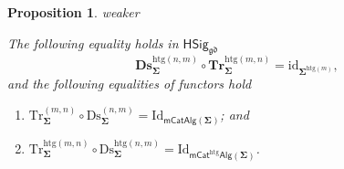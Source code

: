 \documentclass[a4paper, reqno]{amsbook}
\makeatletter
\newcommand{\sig}[1]{\mathbf{#1}}             %
\newcommand{\gd}{\mathfrak{gd}}              %
\newcommand{\htg}{\mathrm{htg}}                %
\newcommand{\id}{\mathrm{id}}
\newcommand{\Id}{\mathrm{Id}}
\newcommand{\Ds}{\mathrm{Ds}}
\newcommand{\Tr}{\mathrm{Tr}}
\newcommand{\bDs}{\mathbf{Ds}}
\newcommand{\bTr}{\mathbf{Tr}}
\theoremstyle{plain}
\newtheorem{proposition}[theorem]{Proposition}
\theoremstyle{definition}
\newcommand*{\CA@leanpending}{}
\newcommand*{\CA@leanrelation}{}
\newcommand*{\lean}[2]{%
  \ifcsname\string\color@lean@#1\endcsname\else
    \PackageError{main}{Unknown relation `#1' in \string\lean}{Use equivalent, weaker or stronger.}%
  \fi
  \gdef\CA@leanrelation{#1}%
  \gdef\CA@leanpending{#2}}
\makeatother
\begin{document}
\begin{proposition}\label{PTrDsId}\lean{weaker}{Dimensions.heterogeneousTruncation_discretization,Dimensions.homogeneousRoundTripFunctor,Dimensions.heterogeneousRoundTripFunctor}
The following equality holds in $\mathsf{HSig}_{\gd}$
$$
\bDs^{\htg(n,m)}_{\sig{\Sigma}}\circ\bTr^{\htg(m,n)}_{\sig{\Sigma}}=\id_{\sig{\Sigma}^{\htg(m)}},
$$
and the following equalities of functors hold
\begin{enumerate}
	\item
	$\Tr^{(m,n)}_{\sig{\Sigma}}\circ\Ds^{(n,m)}_{\sig{\Sigma}}=\Id_{\mathsf{mCatAlg}(\sig{\Sigma})}$; and

	\item
	$\Tr^{\htg(m,n)}_{\sig{\Sigma}}\circ\Ds^{\htg(n,m)}_{\sig{\Sigma}}=\Id_{\mathsf{mCat}^{\htg}\mathsf{Alg}(\sig{\Sigma})}$.
\end{enumerate}
\end{proposition}
\end{document}
